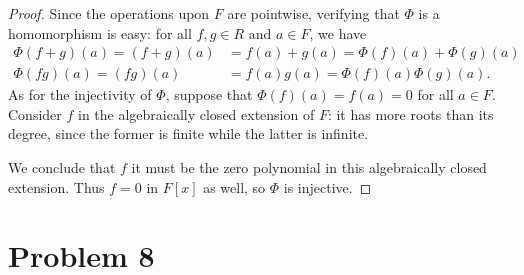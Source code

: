 \documentclass[11pt]{article}
\begin{document}

\begin{proof}
  Since the operations upon $F$ are pointwise, verifying that $\Phi$ is a homomorphism is easy: for all $f, g \in R$ and $a \in F$, we have
  \begin{align*}
    \Phi(f + g)(a) = (f + g)(a) &= f(a) + g(a) = \Phi(f)(a) + \Phi(g)(a) \\
   \Phi(fg)(a) = (fg)(a) &= f(a)g(a) = \Phi(f)(a) \Phi(g)(a).
  \end{align*}
  As for the injectivity of $\Phi$, suppose that $\Phi(f)(a) = f(a) = 0$ for all $a \in F$. Consider $f$ in the algebraically closed extension of $F$: it has more roots than its degree, since the former is finite while the latter is infinite.
  
  We conclude that $f$ it must be the zero polynomial in this algebraically closed extension. Thus $f = 0$ in $F[x]$ as well, so $\Phi$ is injective.
\end{proof}


\section{Problem 8}
\end{document}
